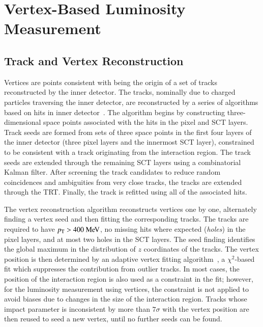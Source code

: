 \section{Vertex-Based Luminosity Measurement}

\subsection{Track and Vertex Reconstruction}

Vertices are points consistent with being the origin of a set of tracks reconstructed by the inner detector. The tracks, nominally due to charged particles traversing the inner detector, are reconstructed by a series of algorithms based on hits in inner detector~\cite{TheATLASCollaboration:2010vk}. The algorithm begins by constructing three-dimensional space points associated with the hits in the pixel and SCT layers. Track seeds are formed from sets of three space points in the first four layers of the inner detector (three pixel layers and the innermost SCT layer), constrained to be consistent with a track originating from the interaction region. The track seeds are extended through the remaining SCT layers using a combinatorial Kalman filter. After screening the track candidates to reduce random coincidences and ambiguities from very close tracks, the tracks are extended through the TRT. Finally, the track is refitted using all of the associated hits. 

The vertex reconstruction algorithm reconstructs vertices one by one, alternately finding a vertex seed and then fitting the corresponding tracks. The tracks are required to have $\pt>400 \MeV$, no missing hits where expected (\emph{holes}) in the pixel layers, and at most two holes in the SCT layers. The seed finding identifies the global maximum in the distribution of $z$ coordinates of the tracks. The vertex position is then determined by an adaptive vertex fitting algorithm~\cite{Fruhwirth:2007hz}, a $\chi^2$-based fit which suppresses the contribution from outlier tracks. In most cases, the position of the interaction region is also used as a constraint in the fit; however, for the luminosity measurement using vertices, the constraint is not applied to avoid biases due to changes in the size of the interaction region. Tracks whose impact parameter is inconsistent by more than $7\sigma$ with the vertex position are then reused to seed a new vertex, until no further seeds can be found. 

